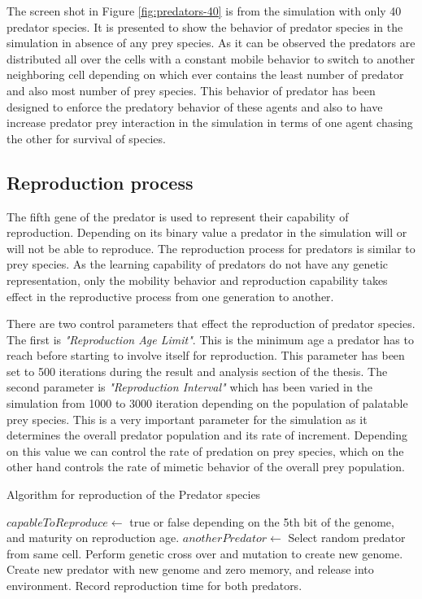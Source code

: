 The screen shot in Figure \ref{fig:predators-40} is from the simulation with only 40 predator species. It is presented to show the behavior of predator species in the simulation in absence of any prey species. As it can be observed the predators are distributed all over the cells with a constant mobile behavior to switch to another neighboring cell depending on which ever contains the least number of predator and also most number of prey species. This behavior of predator has been designed to enforce the predatory behavior of these agents and also to have increase predator prey interaction in the simulation in terms of one agent chasing the other for survival of species. 

\subsection{Reproduction process}
The  fifth gene of the predator is used to represent their capability of reproduction.  Depending on its binary value a predator in the simulation will or will not be able to reproduce. The reproduction process for predators is similar to prey species. As the learning capability of predators do not have any genetic representation, only the mobility behavior and reproduction capability takes effect in the reproductive process from one generation to another. 

There are two control parameters that effect the reproduction of predator species. The first is \textsl{"Reproduction Age Limit"}. This is the minimum age a predator has to reach before starting to involve itself for reproduction. This parameter has been set to 500 iterations during the result and analysis section of the thesis. The second parameter is \textsl{"Reproduction Interval"} which has been varied in the simulation from 1000 to 3000 iteration depending on the population of palatable prey species. This is a very important parameter for the simulation as it determines the overall predator population and its rate of increment. Depending on this value we can control the rate of predation on prey species, which on the other hand controls the rate of mimetic behavior of the overall prey population.

\begin{algorithm}[H]
	\caption{Algorithm for reproduction of the Predator species}
	\label{algo:algorithm-reproduction-predator}
	\begin{algorithmic}
			\STATE $capableToReproduce \gets$ true or false depending on the 5th bit of the genome, and maturity on reproduction age.
				\STATE $anotherPredator \gets$ Select random predator from same cell.
					\STATE Perform genetic cross over and mutation to create new genome.
					\STATE Create new predator with new genome and zero memory, and release into environment.
					\STATE Record reproduction time for both predators.
				\ENDIF
			\ENDIF
		\ENDFOR
	\end{algorithmic}
\end{algorithm}

